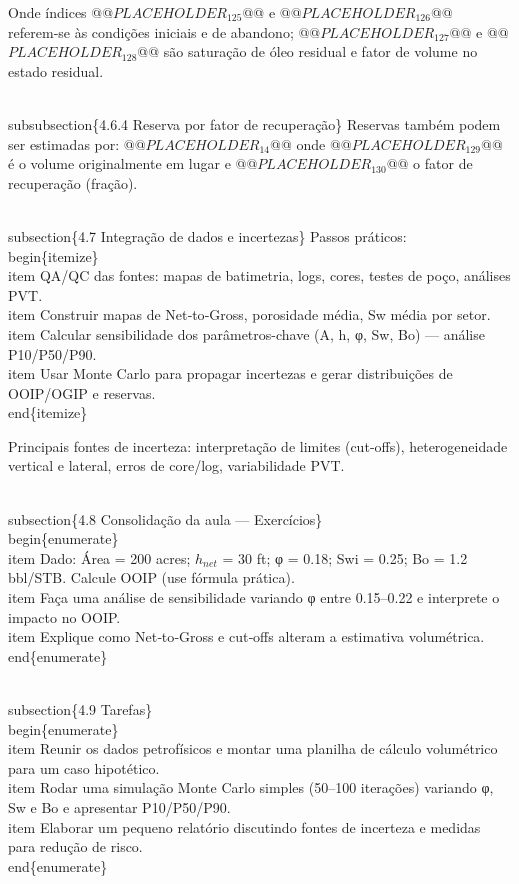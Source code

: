 \documentclass[11pt,a4paper]{article}
\begin{document}
\begin{enumerate}
{Onde índices @@$PLACEHOLDER_{125}$@@ e @@$PLACEHOLDER_{126}$@@ referem‑se às condições iniciais e de abandono; @@$PLACEHOLDER_{127}$@@ e @@$PLACEHOLDER_{128}$@@ são saturação de óleo residual e fator de volume no estado residual.

\\subsubsection\{4.6.4 Reserva por fator de recuperação\}
Reservas também podem ser estimadas por:
@@$PLACEHOLDER_{14}$@@
onde @@$PLACEHOLDER_{129}$@@ é o volume originalmente em lugar e @@$PLACEHOLDER_{130}$@@ o fator de recuperação (fração).

\\subsection\{4.7 Integração de dados e incertezas\}
Passos práticos:
\\begin\{itemize\}
\\item QA/QC das fontes: mapas de batimetria, logs, cores, testes de poço, análises PVT.
\\item Construir mapas de Net‑to‑Gross, porosidade média, Sw média por setor.
\\item Calcular sensibilidade dos parâmetros-chave (A, h, φ, Sw, Bo) — análise P10/P50/P90.
\\item Usar Monte Carlo para propagar incertezas e gerar distribuições de OOIP/OGIP e reservas.
\\end\{itemize\}

Principais fontes de incerteza: interpretação de limites (cut‑offs), heterogeneidade vertical e lateral, erros de core/log, variabilidade PVT.

\\subsection\{4.8 Consolidação da aula — Exercícios\}
\\begin\{enumerate\}
\\item Dado: Área = 200 acres; $h_{net}$ = 30 ft; φ = 0.18; Swi = 0.25; Bo = 1.2 bbl/STB. Calcule OOIP (use fórmula prática).
\\item Faça uma análise de sensibilidade variando φ entre 0.15–0.22 e interprete o impacto no OOIP.
\\item Explique como Net‑to‑Gross e cut‑offs alteram a estimativa volumétrica.
\\end\{enumerate\}

\\subsection\{4.9 Tarefas\}
\\begin\{enumerate\}
\\item Reunir os dados petrofísicos e montar uma planilha de cálculo volumétrico para um caso hipotético.
\\item Rodar uma simulação Monte Carlo simples (50–100 iterações) variando φ, Sw e Bo e apresentar P10/P50/P90.
\\item Elaborar um pequeno relatório discutindo fontes de incerteza e medidas para redução de risco.
\\end\{enumerate\}

}
\end{enumerate}
\end{document}
